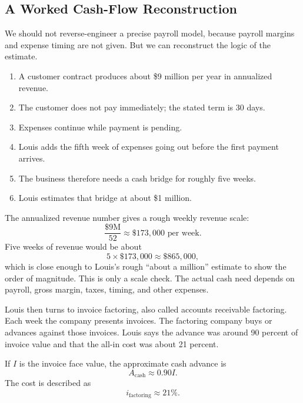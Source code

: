 \subsection{A Worked Cash-Flow Reconstruction}

We should not reverse-engineer a precise payroll model, because payroll margins and expense timing are not given. But we can reconstruct the logic of the estimate.

\begin{enumerate}
\item A customer contract produces about \$9 million per year in annualized revenue.
\item The customer does not pay immediately; the stated term is 30 days.
\item Expenses continue while payment is pending.
\item Louis adds the fifth week of expenses going out before the first payment arrives.
\item The business therefore needs a cash bridge for roughly five weeks.
\item Louis estimates that bridge at about \$1 million.
\end{enumerate}

The annualized revenue number gives a rough weekly revenue scale:
\begin{equation}
\frac{\$9\text{M}}{52}
\approx
\$173{,}000\text{ per week}.
\end{equation}
Five weeks of revenue would be about
\begin{equation}
5 \times \$173{,}000 \approx \$865{,}000,
\end{equation}
which is close enough to Louis's rough ``about a million'' estimate to show the order of magnitude. This is only a scale check. The actual cash need depends on payroll, gross margin, taxes, timing, and other expenses.

Louis then turns to invoice factoring, also called accounts receivable factoring. Each week the company presents invoices. The factoring company buys or advances against those invoices. Louis says the advance was around 90 percent of invoice value and that the all-in cost was about 21 percent.

If \(I\) is the invoice face value, the approximate cash advance is
\begin{equation}
A_{\mathrm{cash}} \approx 0.90 I.
\end{equation}
The cost is described as
\begin{equation}
i_{\mathrm{factoring}} \approx 21\%.
\end{equation}

